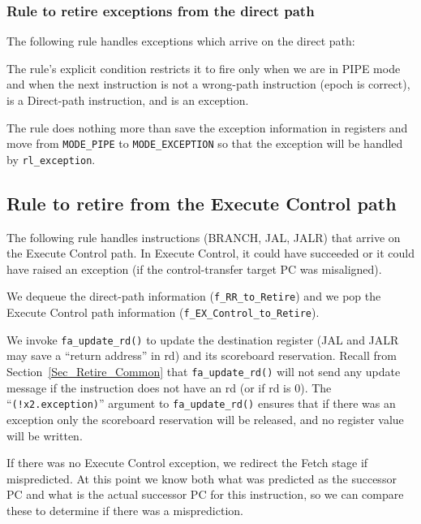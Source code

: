 \subsubsection{Rule to retire exceptions from the direct path}

The following rule handles exceptions which arrive on the direct path:


The rule's explicit condition restricts it to fire only when we are in
PIPE mode and when the next instruction is not a wrong-path
instruction (epoch is correct), is a Direct-path instruction, and is
an exception.

The rule does nothing more than save the exception information in
registers and move from \verb|MODE_PIPE| to \verb|MODE_EXCEPTION| so
that the exception will be handled by \verb|rl_exception|.


\subsection{Rule to retire from the Execute Control path}

\label{Sec_Fife_Retire_Control}

The following rule handles instructions (BRANCH, JAL, JALR) that
arrive on the Execute Control path.  In Execute Control, it could have
succeeded or it could have raised an exception (if the
control-transfer target PC was misaligned).


We dequeue the direct-path information (\verb|f_RR_to_Retire|) and we
pop the Execute Control path information
(\verb|f_EX_Control_to_Retire|).

We invoke \verb|fa_update_rd()| to update the destination register
(JAL and JALR may save a ``return address'' in rd) and its scoreboard
reservation.  Recall from Section~\ref{Sec_Retire_Common} that
\verb|fa_update_rd()| will not send any update message if the
instruction does not have an rd (or if rd is 0).  The
``\verb|(!x2.exception)|'' argument to \verb|fa_update_rd()| ensures
that if there was an exception only the scoreboard reservation will be
released, and no register value will be written.

If there was no Execute Control exception, we redirect the Fetch stage
if mispredicted.  At this point we know both what was predicted as the
successor PC and what is the actual successor PC for this instruction,
so we can compare these to determine if there was a misprediction.

